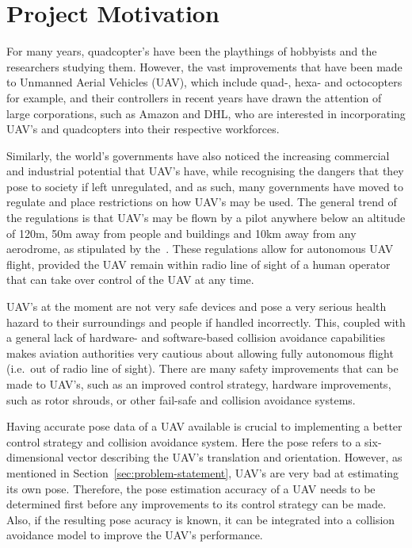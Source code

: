 \section{Project Motivation}

For many years, quadcopter's have been the playthings of hobbyists and the researchers studying them. However, the vast improvements that have been made to Unmanned Aerial Vehicles (UAV), which include quad-, hexa- and octocopters for example, and their controllers in recent years have drawn the attention of large corporations, such as Amazon and DHL, who are interested in incorporating UAV's and quadcopters into their respective workforces. 

Similarly, the world's governments have also noticed the increasing commercial and industrial potential that UAV's have, while recognising the dangers that they pose to society if left unregulated, and as such, many governments have moved to regulate and place restrictions on how UAV's may be used. The general trend of the regulations is that UAV's may be flown by a pilot anywhere below an altitude of 120m, 50m away from people and buildings and 10km away from any aerodrome, as stipulated by the~\cite{sacaa-drone-regs}. These regulations allow for autonomous UAV flight, provided the UAV remain within radio line of sight of a human operator that can take over control of the UAV at any time. 

UAV's at the moment are not very safe devices and pose a very serious health hazard to their surroundings and people if handled incorrectly. This, coupled with a general lack of hardware- and software-based collision avoidance capabilities makes aviation authorities very cautious about allowing fully autonomous flight (i.e.\ out of radio line of sight). There are many safety improvements that can be made to UAV's, such as an improved control strategy, hardware improvements, such as rotor shrouds, or other fail-safe and collision avoidance systems. 

Having accurate pose data of a UAV available is crucial to implementing a better control strategy and collision avoidance system. Here the pose refers to a six-dimensional vector describing the UAV's translation and orientation. However, as mentioned in Section~\ref{sec:problem-statement}, UAV's are very bad at estimating its own pose. Therefore, the pose estimation accuracy of a UAV needs to be determined first before any improvements to its control strategy can be made. Also, if the resulting pose acuracy is known, it can be integrated into a collision avoidance model to improve the UAV's performance. 

